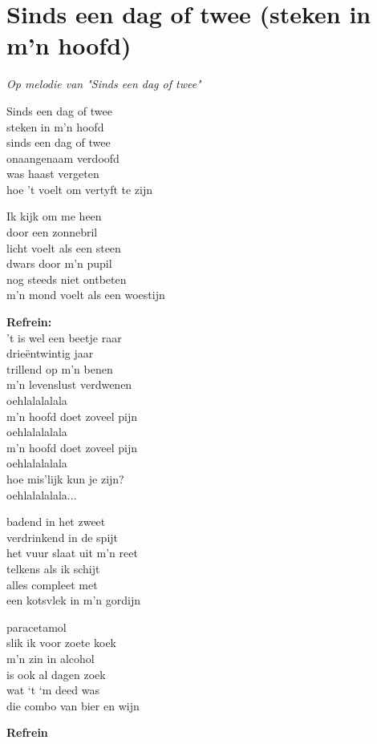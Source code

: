 \section{Sinds een dag of twee (steken in m'n hoofd)}
\textit{Op melodie van "Sinds een dag of twee"}

Sinds een dag of twee\\
steken in m'n hoofd\\
sinds een dag of twee\\
onaangenaam verdoofd\\
was haast vergeten\\
hoe 't voelt om vertyft te zijn

Ik kijk om me heen\\
door een zonnebril\\
licht voelt als een steen\\
dwars door m'n pupil\\
nog steeds niet ontbeten\\
m'n mond voelt als een woestijn

\textbf{Refrein:}\\
't is wel een beetje raar\\
drieëntwintig jaar\\
trillend op m'n benen\\
m'n levenslust verdwenen\\
oehlalalalala\\
m'n hoofd doet zoveel pijn\\
oehlalalalala\\
m'n hoofd doet zoveel pijn\\
oehlalalalala\\
hoe mis’lijk kun je zijn?\\
oehlalalalala...

badend in het zweet\\
verdrinkend in de spijt\\
het vuur slaat uit m’n reet\\
telkens als ik schijt\\
alles compleet met\\
een kotsvlek in m’n gordijn

paracetamol \\
slik ik voor zoete koek\\
m'n zin in alcohol\\
is ook al dagen zoek\\
wat ‘t ‘m deed was\\
die combo van bier en wijn

\textbf{Refrein}